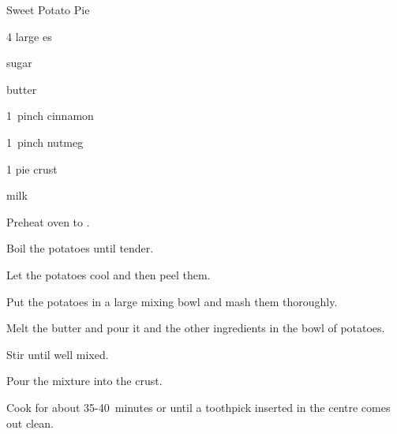 \begin{recipe}{Sweet Potato Pie}{}{}

\begin{ingredients}
\item 4 large es
\item {} sugar
\item \C{\half} butter
\item 1~pinch cinnamon
\item 1~pinch nutmeg
\item 1 pie crust
\item \C{\half} milk
\end{ingredients}

\begin{directions}
\item Preheat oven to .
\item Boil the potatoes until tender.
\item Let the potatoes cool and then peel them.
\item Put the potatoes in a large mixing bowl and mash them thoroughly.
\item Melt the butter and pour it and the other ingredients in the bowl of potatoes.
\item Stir until well mixed. 
\item Pour the mixture into the crust.
\item Cook for about 35-40~minutes or until a toothpick inserted in the centre comes out clean.
\end{directions}

\end{recipe}
